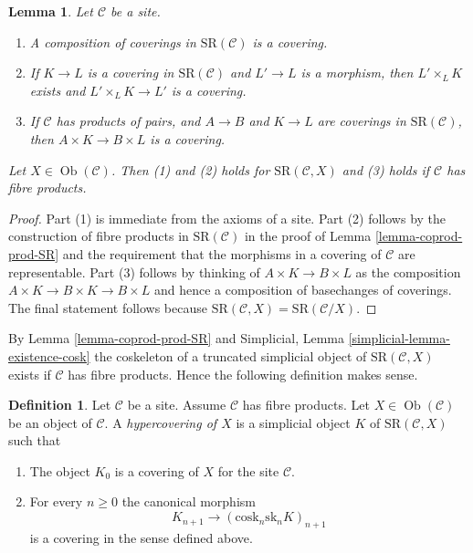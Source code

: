 \documentclass{stacks-project}
\theoremstyle{plain}
\newtheorem{lemma}[subsection]{Lemma}
\theoremstyle{definition}
\newtheorem{definition}[subsection]{Definition}
\theoremstyle{remark}
\numberwithin{equation}{subsection}
\def\Ob{\mathop{\mathrm{Ob}}\nolimits}
\begin{document}
\begin{lemma}
\label{lemma-covering-permanence}
Let $\mathcal{C}$ be a site.
\begin{enumerate}
\item A composition of coverings in $\text{SR}(\mathcal{C})$
is a covering.
\item If $K \to L$ is a covering in $\text{SR}(\mathcal{C})$
and $L' \to L$ is a morphism, then $L' \times_L K$ exists
and $L' \times_L K \to L'$ is a covering.
\item If $\mathcal{C}$ has products of pairs, and
$A \to B$ and $K \to L$ are coverings in $\text{SR}(\mathcal{C})$,
then $A \times K \to B \times L$ is a covering.
\end{enumerate}
Let $X \in \Ob(\mathcal{C})$. Then (1) and (2) holds for
$\text{SR}(\mathcal{C}, X)$ and (3) holds if $\mathcal{C}$
has fibre products.
\end{lemma}

\begin{proof}
Part (1) is immediate from the axioms of a site.
Part (2) follows by the construction of fibre products
in $\text{SR}(\mathcal{C})$ in the proof of
Lemma \ref{lemma-coprod-prod-SR}
and the requirement that the morphisms in a covering
of $\mathcal{C}$ are representable.
Part (3) follows by thinking of $A \times K \to B \times L$
as the composition $A \times K \to B \times K \to B \times L$
and hence a composition of basechanges of coverings.
The final statement follows because $\text{SR}(\mathcal{C}, X) =
\text{SR}(\mathcal{C}/X)$.
\end{proof}

\noindent
By Lemma \ref{lemma-coprod-prod-SR} and
Simplicial, Lemma \ref{simplicial-lemma-existence-cosk}
the coskeleton of a truncated simplicial object of
$\text{SR}(\mathcal{C}, X)$ exists if $\mathcal{C}$ has fibre products.
Hence the following definition makes sense.

\begin{definition}
\label{definition-hypercovering}
Let $\mathcal{C}$ be a site. Assume $\mathcal{C}$ has fibre products.
Let $X \in \Ob(\mathcal{C})$ be an object of $\mathcal{C}$.
A {\it hypercovering of $X$} is a simplicial object
$K$ of $\text{SR}(\mathcal{C}, X)$ such that
\begin{enumerate}
\item The object $K_0$ is a covering of $X$ for the site $\mathcal{C}$.
\item For every $n \geq 0$ the canonical morphism
$$
K_{n + 1} \longrightarrow (\text{cosk}_n \text{sk}_n K)_{n + 1}
$$
is a covering in the sense defined above.
\end{enumerate}
\end{definition}
\end{document}
